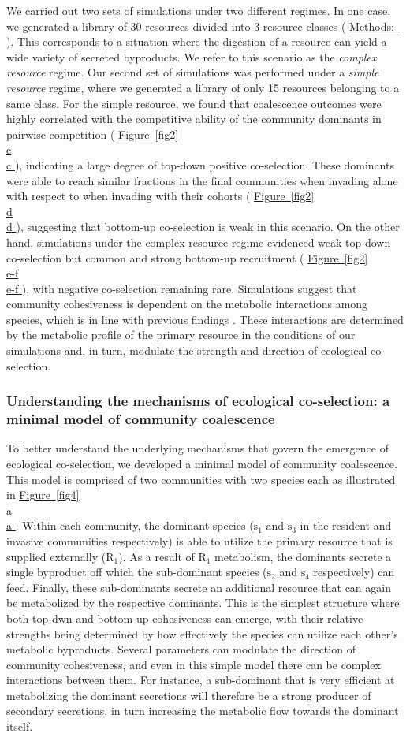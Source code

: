 \documentclass[a4paper,10pt]{article}
\newcommand{\figref}[2][]{%
  \hyperref[{#2}]{%
    Figure~\ref*{#2}%
    \ifx\\#1\\%
    \else
      #1%
    \fi
  }%
}
\newcommand{\methodsref}[1]{%
  \hyperref[{methods:#1}]{%
   Methods:~\nameref*{methods:#1}%
  }%
}
\begin{document}
We carried out two sets of simulations under two different regimes.
In one case, we generated a library of 30 resources divided into 3 resource classes
(\methodsref{sim}). This corresponds to a situation where the digestion of a resource
can yield a wide variety of secreted byproducts.
We refer to this scenario as the \textit{complex resource} regime.
Our second set of simulations was performed under a \textit{simple resource} regime, where we
generated a library of only 15 resources belonging to a same class.
For the simple resource, we found that coalescence outcomes were highly correlated with
the competitive ability of the community dominants in pairwise competition
(\figref[c]{fig2}),
indicating a large degree of top-down positive co-selection.
These dominants were able to reach similar fractions in the final communities when invading alone
with respect to when invading with their cohorts
(\figref[d]{fig2}),
suggesting that bottom-up co-selection is weak in this scenario.
On the other hand,
simulations under the complex resource regime evidenced weak top-down co-selection but 
common and strong bottom-up recruitment (\figref[e-f]{fig2}), with negative co-selection remaining rare.
Simulations suggest that community cohesiveness is dependent on the metabolic interactions among species,
which is in line with previous findings \cite{Goldford2018, Estrela2020}.
These interactions are determined by the metabolic profile of the primary resource in the conditions
of our simulations and, in turn, modulate the strength and direction of ecological co-selection.
\fi

\subsubsection*{Understanding the mechanisms of ecological co-selection: a minimal model of community coalescence}

To better understand the underlying mechanisms that govern
the emergence of ecological co-selection,
we developed a minimal model of community coalescence.
This model is comprised of two communities with two species each
as illustrated in \figref[a]{fig4}.
Within each community, the dominant species
($\mathrm{s}_1$ and $\mathrm{s}_3$ in the resident and invasive communities
respectively)
is able to utilize the primary resource that is supplied externally ($\mathrm{R}_1$).
As a result of $\mathrm{R}_1$ metabolism,
the dominants secrete a single byproduct off which
the sub-dominant species ($\mathrm{s}_2$ and $\mathrm{s}_4$ respectively) can feed.
Finally, these sub-dominants secrete an additional resource that can again
be metabolized by the respective dominants.
This is the simplest structure where both top-dwn and bottom-up
cohesiveness can emerge, with their relative strengths being determined
by how effectively the species can utilize each other's metabolic byproducts.
Several parameters can modulate the direction of community cohesiveness,
and even in this simple model there can be complex interactions between them.
For instance, a sub-dominant that is very efficient at metabolizing the dominant
secretions will therefore be a strong producer of secondary secretions,
in turn increasing the metabolic flow towards the dominant itself.
\end{document}
